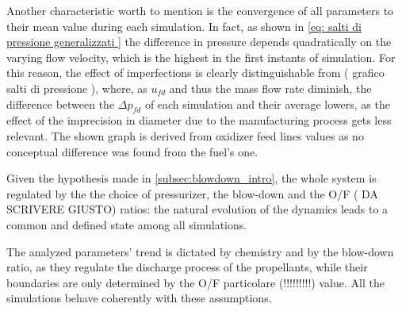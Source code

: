 Another characteristic worth to mention is the convergence of all parameters to their mean value during each simulation.
In fact, as shown in \autoref{eq: salti di pressione generalizzati } the difference in pressure depends quadratically on the varying flow velocity, which is the highest in the first instants of simulation. 
For this reason, the effect of imperfections is clearly distinguishable from ( grafico salti di pressione ), where, as $u_{fd}$ and thus the mass flow rate diminish, the difference between the $\Delta p_{fd}$ of each simulation and their average lowers, as the effect of the imprecision in diameter due to the manufacturing process gets less relevant. The shown graph is derived from oxidizer feed lines values as no conceptual difference was found from the fuel's one. 

Given the hypothesis made in \autoref{subsec:blowdown_intro}, the whole system is regulated by the the choice of pressurizer, the blow-down and the O/F ( DA SCRIVERE GIUSTO) ratios: the natural evolution of the dynamics leads to a common and defined state among all simulations.

The analyzed parameters' trend is dictated by chemistry and by the blow-down ratio, as they regulate the discharge process of the propellants, while their boundaries are only determined by the O/F particolare (!!!!!!!!!) value. All the simulations behave coherently  with these assumptions. 











